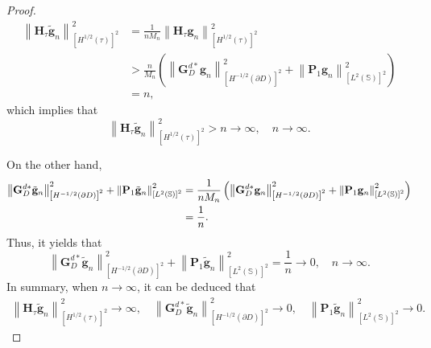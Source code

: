 \documentclass[11pt,reqno,twoside]{amsart}
\theoremstyle{definition}
\theoremstyle{remark}
\numberwithin{equation}{section}
\begin{document}
\begin{proof}
\begin{equation}
\begin{aligned}
\left\| \mathbf H_{\tau} \tilde{\mathbf g}_n\right\|^2_{\left[H^{1/2}\left(\tau \right) \right] ^2 }
&= \frac{1}{n M_n} \left\| \mathbf H_{\tau} \mathbf g_n \right\|^2_{\left[H^{1/2}\left(\tau \right) \right] ^2 } \\
&>\frac{n}{M_n} \left( \left\|  \mathbf G_D^{d*} \mathbf g_n \right\|^2_{\left[H^{-1/2}\left(\partial D \right) \right] ^2}+\left\|  \mathbf P_1 \mathbf g_n \right\|^2_{\left[L^{2}\left(\mathbb S \right) \right] ^2} \right) \\
&= n,
\end{aligned}\end{equation}
which implies that 
$$
\left\| \mathbf H_{\tau} \tilde{\mathbf g}_n \right\|^2_{\left[H^{1/2}\left(\tau \right) \right] ^2 } > n \to \infty,\quad   n \to \infty .
$$

On the other hand, 
\begin{equation}\notag
\begin{aligned}
		\left\| \mathbf G_D^{d*} \tilde{\mathbf g}_n \right\|^2_{\left[H^{-1/2}\left(\partial D \right) \right] ^2}+\left\| \mathbf P_1 \tilde{\mathbf g}_n \right\|^2_{\left[L^{2}\left(\mathbb S \right) \right] ^2}
		&= \frac{1}{n M_n} \left(\left\| \mathbf G_D^{d*} \mathbf g_n \right\|^2_{\left[H^{-1/2}\left(\partial D \right) \right] ^2}+\left\| \mathbf P_1 \mathbf g_n \right\|^2_{\left[L^{2}\left(\mathbb S \right) \right] ^2} \right) \\
		&= \frac{1}{n}.
\end{aligned}\end{equation}
Thus, it yields that 
$$
\left\| \mathbf G_D^{d*} \tilde{\mathbf g}_n \right\|^2_{\left[H^{-1/2}\left(\partial D \right) \right] ^2}+\left\| \mathbf P_1 \tilde{\mathbf g}_n \right\|^2_{\left[L^{2}\left(\mathbb S \right) \right] ^2}= \frac{1}{n} \to 0, \quad n \to \infty .
$$
In summary, when $n \to \infty $, it can be deduced that
\begin{equation}\begin{aligned}\label{eq:HGPasymptotic}
  \left\| \mathbf H_{\tau} \tilde{\mathbf g}_n \right\|^2_{\left[H^{1/2}\left(\tau \right) \right] ^2 } \to \infty ,\quad \left\| \mathbf G_D^{d*} \tilde{\mathbf g}_n \right\|^2_{\left[H^{-1/2}\left(\partial D \right) \right] ^2} \to 0,\quad \left\| \mathbf P_1 \tilde{\mathbf g}_n \right\|^2_{\left[L^{2}\left(\mathbb S \right) \right] ^2} \to 0.
 \end{aligned}\end{equation}


\end{proof}
\end{document}
